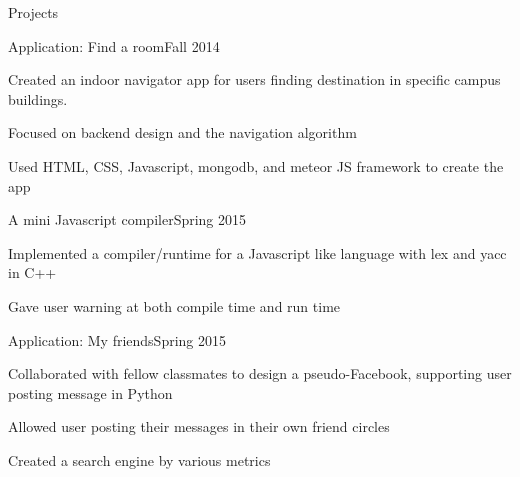 \documentclass{resume} %
\begin{document}
\begin{rSection}{Projects}

\begin{rSubsection}{Application: Find a room}{Fall 2014}{}{}
\item Created an indoor navigator app for users finding destination in specific campus buildings.
\item Focused on backend design and the navigation algorithm
\item Used HTML, CSS, Javascript, mongodb, and meteor JS framework to create the app
\end{rSubsection}

\begin{rSubsection}{A mini Javascript compiler}{Spring 2015}{}{}
\item Implemented a compiler/runtime for a Javascript like language with lex and yacc in C++
\item Gave user warning at both compile time and run time
\end{rSubsection}

\begin{rSubsection}{Application: My friends}{Spring 2015}{}{}
\item Collaborated with fellow classmates to design a pseudo-Facebook, supporting user posting message in Python
\item Allowed user posting their messages in their own friend circles
\item Created a search engine by various metrics
\end{rSubsection}









\end{rSection}
\end{document}
